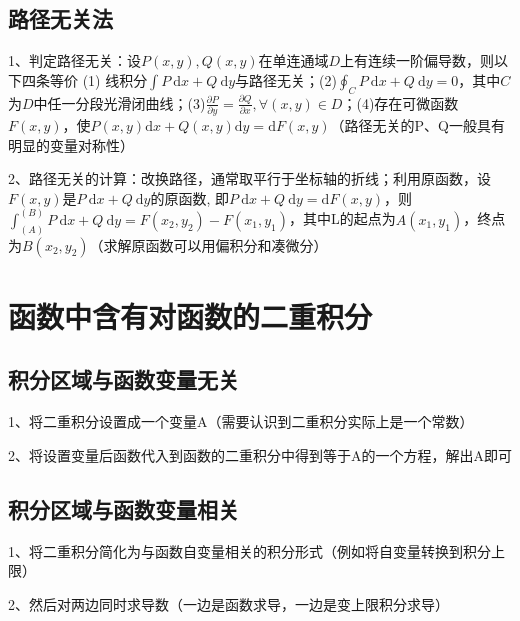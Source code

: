 \subsection{路径无关法}

1、判定路径无关：设$ P(x, y), Q(x, y) $在单连通域$ D $上有连续一阶偏导数，则以下四条等价 (1) 线积分$ \int P \mathrm{~d} x+Q \mathrm{~d} y $与路径无关；(2)$ \oint_{C} P \mathrm{~d} x+Q \mathrm{~d} y=0 $，其中$ C $为$ D $中任一分段光滑闭曲线；(3)$ \frac{\partial P}{\partial y}=\frac{\partial Q}{\partial x}, \forall(x, y) \in D $；(4)存在可微函数$ F(x, y) $，使$ P(x, y) \mathrm{d} x+Q(x, y) \mathrm{d} y=\mathrm{d} F(x, y) $（路径无关的P、Q一般具有明显的变量对称性）

2、路径无关的计算：改换路径，通常取平行于坐标轴的折线；利用原函数，设$ F(x, y) $是$ P \mathrm{~d} x+Q \mathrm{~d} y $的原函数, 即$ P \mathrm{~d} x+Q \mathrm{~d} y=\mathrm{d} F(x, y) $，则$ \int_{(A)}^{(B)} P \mathrm{~d} x+Q \mathrm{~d} y=F\left(x_{2}, y_{2}\right)-F\left(x_{1}, y_{1}\right) $，其中L的起点为$ A\left(x_{1}, y_{1}\right) $，终点为$ B\left(x_{2}, y_{2}\right) $（求解原函数可以用偏积分和凑微分）

\section{函数中含有对函数的二重积分}



\subsection{积分区域与函数变量无关}

1、将二重积分设置成一个变量A（需要认识到二重积分实际上是一个常数）

2、将设置变量后函数代入到函数的二重积分中得到等于A的一个方程，解出A即可



\subsection{积分区域与函数变量相关}

1、将二重积分简化为与函数自变量相关的积分形式（例如将自变量转换到积分上限）

2、然后对两边同时求导数（一边是函数求导，一边是变上限积分求导）

